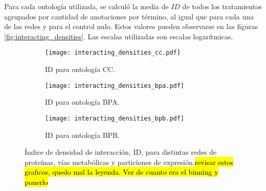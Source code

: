 Para cada ontología utilizada, se calculó la media de $ID$ de todos los tratamientos agrupados por cantidad de anotaciones por término, al igual que para cada una de las redes y para el control nulo. Estos valores pueden observarse en las figuras \ref{fig:interacting_densities}. Las escalas utilizadas son escalas logarítmicas. 
\begin{figure*}[t!]
    \centering
    \begin{subfigure}[t]{0.45\textwidth}
    \centering
    \texttt{[image: interacting\_densities\_cc.pdf]}
    \caption{ID para ontología CC.}
    \end{subfigure}
    \begin{subfigure}[t]{0.45\textwidth}
    \centering
    \texttt{[image: interacting\_densities\_bpa.pdf]}
    \caption{ID para ontología BPA.}
    \end{subfigure}
    \begin{subfigure}[t]{0.45\textwidth}
    \centering
    \texttt{[image: interacting\_densities\_bpb.pdf]}
    \caption{ID para ontología BPB.}
    \end{subfigure}    
    \caption{Índice de densidad de interacción, ID, para distintas redes de proteínas, vías metabólicas y particiones de expresión.\hl{revisar estos graficos, quedo mal la leyenda. Ver de cuanto era el binning y ponerlo}}
    \label{interacting_densities}
\end{figure*}

